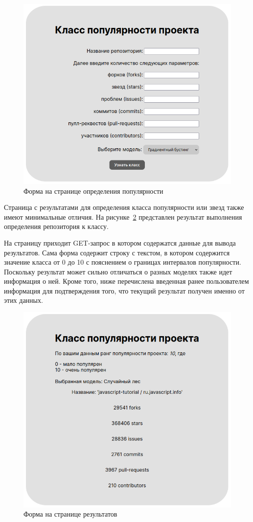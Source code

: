 \begin{figure}[h]
    \centering
    \includegraphics[width=0.9\linewidth]{pic/input.png}
    \vspace{0.5em}    \caption{Форма на странице определения популярности}
    \label{ris:input}
\end{figure}
\vspace{1em}

Страница с результатами для определения класса популярности или звезд также имеют минимальные отличия. На рисунке~\ref{ris:result} представлен результат выполнения определения репозитория к классу.

На страницу приходит GET-запрос в котором содержатся данные для вывода результатов. Сама форма содержит строку с текстом, в котором содержится значение класса от 0 до 10 с пояснением о границах интервалов популярности. Поскольку результат может сильно отличаться о разных моделях также идет информация о ней. Кроме того, ниже перечислена введенная ранее пользователем информация для подтверждения того, что текущий результат получен именно от этих данных.

\begin{figure}[h]
    \centering
    \includegraphics[width=0.9\linewidth]{pic/result.png}
    \vspace{0.5em}    \caption{Форма на странице результатов}
    \label{ris:result}
\end{figure}
\vspace{1em}